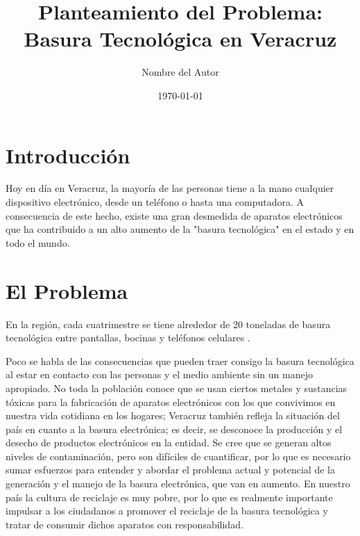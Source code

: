 \documentclass{article}
\title{Planteamiento del Problema: Basura Tecnológica en Veracruz}
\author{Nombre del Autor}
\date{\today}
\begin{document}
\maketitle

\section{Introducción}
Hoy en día en Veracruz, la mayoría de las personas tiene a la mano cualquier dispositivo electrónico, desde un teléfono o hasta una computadora. A consecuencia de este hecho, existe una gran desmedida de aparatos electrónicos que ha contribuido a un alto aumento de la "basura tecnológica" en el estado y en todo el mundo.

\section{El Problema}
En la región, cada cuatrimestre se tiene alrededor de 20 toneladas de basura tecnológica entre pantallas, bocinas y teléfonos celulares \cite{periodistasdigitales}.

Poco se habla de las consecuencias que pueden traer consigo la basura tecnológica al estar en contacto con las personas y el medio ambiente sin un manejo apropiado. No toda la población conoce que se usan ciertos metales y sustancias tóxicas para la fabricación de aparatos electrónicos con los que convivimos en nuestra vida cotidiana en los hogares; Veracruz también refleja la situación del país en cuanto a la basura electrónica; es decir, se desconoce la producción y el desecho de productos electrónicos en la entidad. Se cree que se generan altos niveles de contaminación, pero son difíciles de cuantificar, por lo que es necesario sumar esfuerzos para entender y abordar el problema actual y potencial de la generación y el manejo de la basura electrónica, que van en aumento. En nuestro país la cultura de reciclaje es muy pobre, por lo que es realmente importante impulsar a los ciudadanos a promover el reciclaje de la basura tecnológica y tratar de consumir dichos aparatos con responsabilidad.



\end{document}
